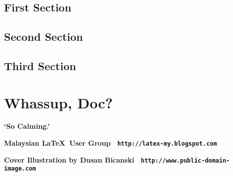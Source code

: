 \documentclass[11pt,twoside,openany,x11names,svgnames]{memoir}
\newcommand\chapterillustration{}
\begin{document}
\section{First Section}
\lipsum[1-6]

\section{Second Section}
\lipsum[7-11]

\section{Third Section}
\lipsum[12-15]

\renewcommand\chapterillustration{cherry-tomatos}
\chapter{Whassup, Doc?}
\lipsum[5-6]

\cleartoverso




\enlargethispage{3\baselineskip}
\thispagestyle{empty}
\pagecolor[HTML]{0E0407}

\begin{center}
\begin{minipage}{.8\textwidth}
\color{Cornsilk}\Large\bfseries
\lipsum[1]

\begin{center}
\huge\bfseries\sffamily\color{lime}`So Calming.'
\end{center}

\lipsum[2]

\end{minipage}
\end{center}


\begin{center}
\colorbox{white}{\EANisbn[SC4]}

\vspace*{\baselineskip}

\textbf{\textcolor{LightGoldenrod!50!Gold}{Malaysian \LaTeX\ User Group \textbullet\ \texttt{http://latex-my.blogspot.com}}}

\vspace*{\baselineskip}

\textbf{\textcolor{LightGoldenrod}{Cover Illustration by Dusan Bicanski \textbullet\ \texttt{http://www.public-domain-image.com}}}
\end{center}
\end{document}
